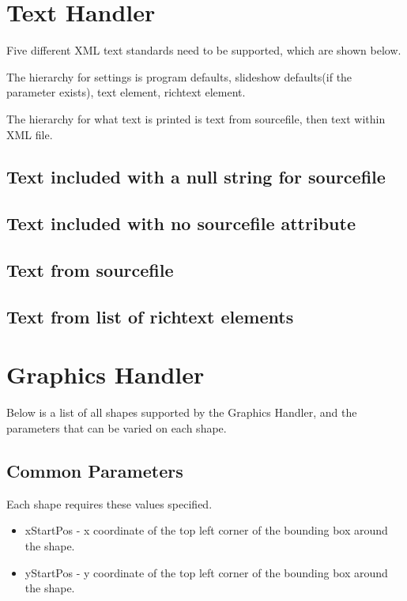 \documentclass{article}
\begin{document}
\clearpage
\section{Text Handler}
Five different XML text standards need to be supported, which are shown below.

The hierarchy for settings is program defaults, slideshow defaults(if the parameter exists), text element, richtext element.

The hierarchy for what text is printed is text from sourcefile, then text within XML file.
\subsection{Text included with a null string for sourcefile}
\lstset{language=XML}


\subsection{Text included with no sourcefile attribute}


\subsection{Text from sourcefile}


\subsection{Text from list of richtext elements}

	
\clearpage

\section{Graphics Handler}
Below is a list of all shapes supported by the Graphics Handler, and the parameters that can be varied on each shape. 

\subsection{Common Parameters}
Each shape requires these values specified. 
\begin{itemize}
\item xStartPos - x coordinate of the top left corner of the bounding box around the shape.
\item yStartPos - y coordinate of the top left corner of the bounding box around the shape.
\end{itemize}
\end{document}
